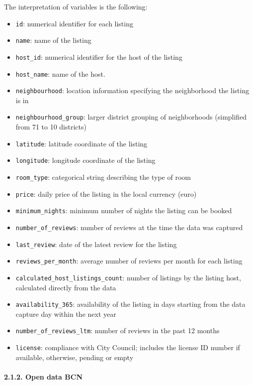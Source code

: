 \documentclass[
]{article}
\providecommand{\tightlist}{%
  \setlength{\itemsep}{0pt}\setlength{\parskip}{0pt}}
\begin{document}
The interpretation of variables is the following:

\begin{itemize}
\tightlist
\item
  \texttt{id}: numerical identifier for each listing
\item
  \texttt{name}: name of the listing
\item
  \texttt{host\_id}: numerical identifier for the host of the listing
\item
  \texttt{host\_name}: name of the host.
\item
  \texttt{neighbourhood}: location information specifying the
  neighborhood the listing is in
\item
  \texttt{neighbourhood\_group}: larger district grouping of
  neighborhoods (simplified from 71 to 10 districts)
\item
  \texttt{latitude}: latitude coordinate of the listing
\item
  \texttt{longitude}: longitude coordinate of the listing
\item
  \texttt{room\_type}: categorical string describing the type of room
\item
  \texttt{price}: daily price of the listing in the local currency
  (euro)
\item
  \texttt{minimum\_nights}: minimum number of nights the listing can be
  booked
\item
  \texttt{number\_of\_reviews}: number of reviews at the time the data
  was captured
\item
  \texttt{last\_review}: date of the latest review for the listing
\item
  \texttt{reviews\_per\_month}: average number of reviews per month for
  each listing
\item
  \texttt{calculated\_host\_listings\_count}: number of listings by the
  listing host, calculated directly from the data
\item
  \texttt{availability\_365}: availability of the listing in days
  starting from the data capture day within the next year
\item
  \texttt{number\_of\_reviews\_ltm}: number of reviews in the past 12
  months
\item
  \texttt{license}: compliance with City Council; includes the license
  ID number if available, otherwise, pending or empty
\end{itemize}

\hypertarget{open-data-bcn-1}{%
\paragraph{2.1.2. Open data BCN}\label{open-data-bcn-1}}
\end{document}
